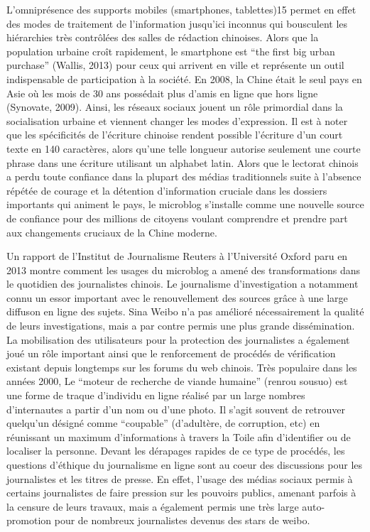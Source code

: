 L’omniprésence des supports mobiles (smartphones, tablettes)15 permet en effet des modes de traitement de l’information jusqu’ici inconnus qui bousculent les hiérarchies très contrôlées des salles de rédaction chinoises. Alors que la population urbaine croît rapidement, le smartphone est “the first big urban purchase” (Wallis, 2013) pour ceux qui arrivent en ville et représente un outil indispensable de participation à la société. En 2008, la Chine était le seul pays en Asie où les mois de 30 ans possédait plus d’amis en ligne que hors ligne (Synovate, 2009). Ainsi, les réseaux sociaux jouent un rôle primordial dans la socialisation urbaine et viennent changer les modes d’expression. Il est à noter que les spécificités de l’écriture chinoise rendent possible l’écriture d’un court texte en 140 caractères, alors qu’une telle longueur autorise seulement une courte phrase dans une écriture utilisant un alphabet latin. Alors que le lectorat chinois a perdu toute confiance dans la plupart des médias traditionnels suite à l’absence répétée de courage et la détention d’information cruciale dans les dossiers importants qui animent le pays, le microblog s’installe comme une nouvelle source de confiance pour des millions de citoyens voulant comprendre et prendre part aux changements cruciaux de la Chine moderne.

Un rapport de l’Institut de Journalisme Reuters à l’Université Oxford paru en 2013 montre comment les usages du microblog a amené des transformations dans le quotidien des journalistes chinois. Le journalisme d’investigation a notamment connu un essor important avec le renouvellement des sources grâce à une large diffuson en ligne des sujets. Sina Weibo n’a pas amélioré nécessairement la qualité de leurs investigations, mais a par contre permis une plus grande dissémination. La mobilisation des utilisateurs pour la protection des journalistes a également joué un rôle important ainsi que le renforcement de procédés de vérification existant depuis longtemps sur les forums du web chinois. Très populaire dans les années 2000, Le “moteur de recherche de viande humaine” (renrou sousuo) est une forme de traque d’individu en ligne réalisé par un large nombres d’internautes a partir d’un nom ou d’une photo. Il s’agit souvent de retrouver quelqu’un désigné comme “coupable” (d’adultère, de corruption, etc) en réunissant un maximum d’informations à travers la Toile afin d’identifier ou de localiser la personne. Devant les dérapages rapides de ce type de procédés, les questions d’éthique du journalisme en ligne sont au coeur des discussions pour les journalistes et les titres de presse. En effet, l’usage des médias sociaux permis à certains journalistes de faire pression sur les pouvoirs publics, amenant parfois à la censure de leurs travaux, mais a également permis une très large auto-promotion pour de nombreux journalistes devenus des stars de weibo.

